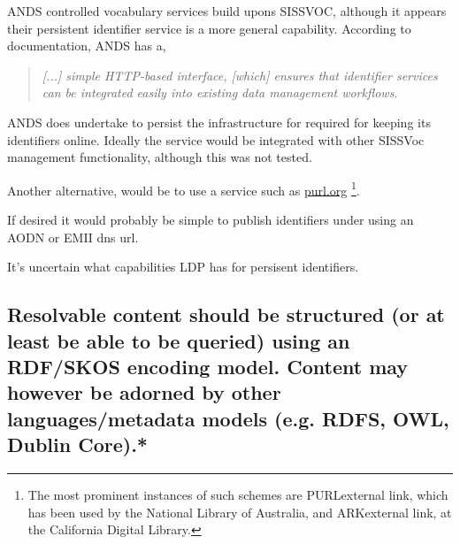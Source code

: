 \documentclass[10pt,a4paper]{article}
\newenvironment{italicquotes}
{\begin{quote}\itshape}
{\end{quote}}
\begin{document}
\begin{flushleft}
  \item[ANDS] controlled vocabulary services build upons SISSVOC, although it appears
  their persistent identifier service is a more general capability. According to
  documentation, ANDS has a, 

  \begin{italicquotes} [...] simple HTTP-based interface, [which] ensures that
  identifier services can be integrated easily into existing data management
  workflows.  \end{italicquotes}
  ANDS does undertake to persist the infrastructure for required for
  keeping its identifiers online. Ideally the service would be integrated
  with other SISSVoc management functionality, although this was not tested.

  \item[]Another alternative, would be to use a service such as \url{purl.org}  \footnote{ The most
  prominent instances of such schemes are PURLexternal link, which has been used
  by the National Library of Australia, and ARKexternal link, at the California
  Digital Library.  }. 


  \item[]If desired it would probably be simple to publish identifiers under using an
  AODN or EMII dns url.   
  
  It's uncertain what capabilities LDP has for persisent identifiers.



% 
%   
% 
% 
% 



\subsection{Resolvable content should be structured (or at least be able to be queried)
  using an RDF/SKOS encoding model. Content may however be adorned by other
  languages/metadata models (e.g. RDFS, OWL, Dublin Core).* }


\end{flushleft}
\end{document}
